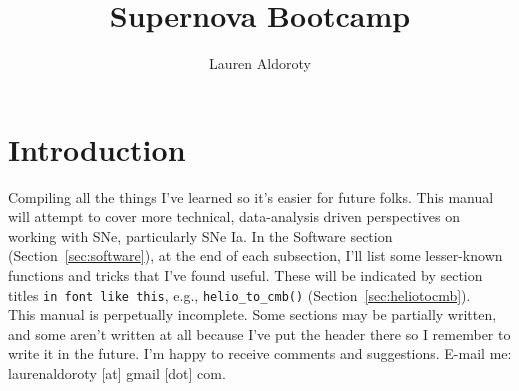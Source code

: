\documentclass{ol-softwaremanual}
\title{Supernova Bootcamp}
\author{Lauren Aldoroty}
\begin{document}
\maketitle

\tableofcontents
\newpage

\section{Introduction}

Compiling all the things I've learned so it's easier for future folks. This manual will attempt to cover more technical, data-analysis driven perspectives on working with SNe, particularly SNe Ia. In the Software section (Section~\ref{sec:software}), at the end of each subsection, I'll list some lesser-known functions and tricks that I've found useful. These will be indicated by section titles \texttt{in font like this}, e.g., \texttt{helio\_to\_cmb()} (Section~\ref{sec:heliotocmb}).\\

This manual is perpetually incomplete. Some sections may be partially written, and some aren't written at all because I've put the header there so I remember to write it in the future. I'm happy to receive comments and suggestions. E-mail me: laurenaldoroty [at] gmail [dot] com. 










\end{document}
